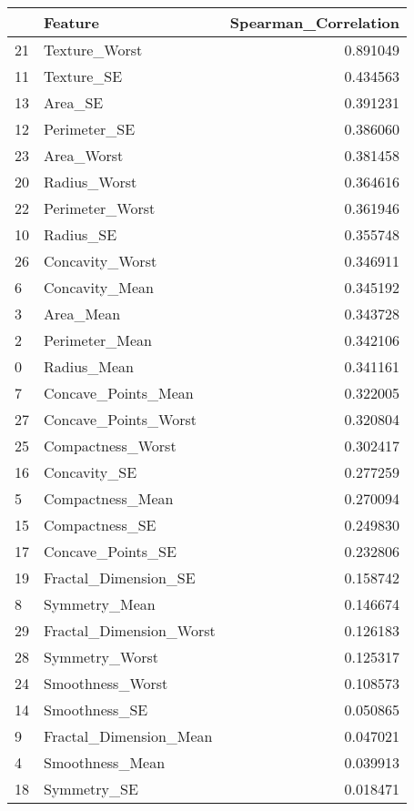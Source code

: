 \begin{tabular}{llr}
\toprule
 & Feature & Spearman_Correlation \\
\midrule
21 & Texture_Worst & 0.891049 \\
11 & Texture_SE & 0.434563 \\
13 & Area_SE & 0.391231 \\
12 & Perimeter_SE & 0.386060 \\
23 & Area_Worst & 0.381458 \\
20 & Radius_Worst & 0.364616 \\
22 & Perimeter_Worst & 0.361946 \\
10 & Radius_SE & 0.355748 \\
26 & Concavity_Worst & 0.346911 \\
6 & Concavity_Mean & 0.345192 \\
3 & Area_Mean & 0.343728 \\
2 & Perimeter_Mean & 0.342106 \\
0 & Radius_Mean & 0.341161 \\
7 & Concave_Points_Mean & 0.322005 \\
27 & Concave_Points_Worst & 0.320804 \\
25 & Compactness_Worst & 0.302417 \\
16 & Concavity_SE & 0.277259 \\
5 & Compactness_Mean & 0.270094 \\
15 & Compactness_SE & 0.249830 \\
17 & Concave_Points_SE & 0.232806 \\
19 & Fractal_Dimension_SE & 0.158742 \\
8 & Symmetry_Mean & 0.146674 \\
29 & Fractal_Dimension_Worst & 0.126183 \\
28 & Symmetry_Worst & 0.125317 \\
24 & Smoothness_Worst & 0.108573 \\
14 & Smoothness_SE & 0.050865 \\
9 & Fractal_Dimension_Mean & 0.047021 \\
4 & Smoothness_Mean & 0.039913 \\
18 & Symmetry_SE & 0.018471 \\
\bottomrule
\end{tabular}
